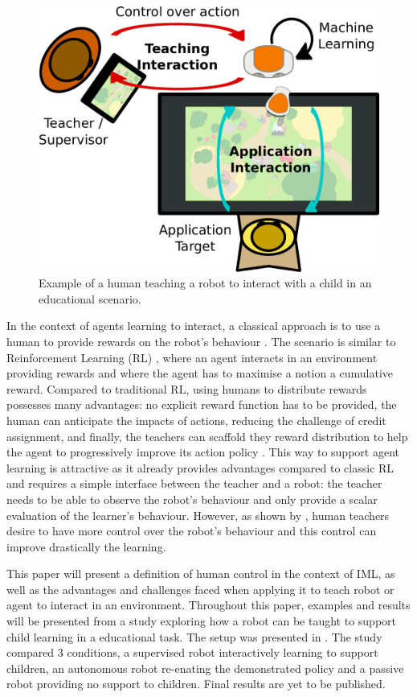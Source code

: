 \documentclass[letterpaper, 10 pt, conference]{ieeeconf}  %
\begin{document}
\begin{figure}[ht]
	\includegraphics[width=.8\linewidth]{setup.pdf}
	\centering
	\caption{Example of a human teaching a robot to interact with a child in an educational scenario.}
	\label{fig:frame}
\end{figure}

In the context of agents learning to interact, a classical approach is to use a human to provide rewards on the robot's behaviour \cite{knox2009interactively}. The scenario is similar to Reinforcement Learning (RL) \cite{sutton1998reinforcement}, where an agent interacts in an environment providing rewards and where the agent has to maximise a notion a cumulative reward. Compared to traditional RL, using humans to distribute rewards possesses many advantages: no explicit reward function has to be provided, the human can anticipate the impacts of actions, reducing the challenge of credit assignment, and finally, the teachers can scaffold they reward distribution to help the agent to progressively improve its action policy \cite{macglashan2017interactive}. This way to support agent learning is attractive as it already provides advantages compared to classic RL and requires a simple interface between the teacher and a robot: the teacher needs to be able to observe the robot's behaviour and only provide a scalar evaluation of the learner's behaviour. However, as shown by \cite{thomaz2008teachable,amershi2014power,senft2017supervised}, human teachers desire to have more control over the  robot's behaviour and this control can improve drastically the learning.

This paper will present a definition of human control in the context of IML, as well as the advantages and challenges faced when applying it to teach robot or agent to interact in an environment. Throughout this paper, examples and results will be presented from a study exploring how a robot can be taught to support child learning in a educational task. The setup was presented in \cite{senft2018robots}. The study compared 3 conditions, a supervised robot interactively learning to support children, an autonomous robot re-enating the demonstrated policy and a passive robot providing no support to children. Final results are yet to be published. %
\end{document}
